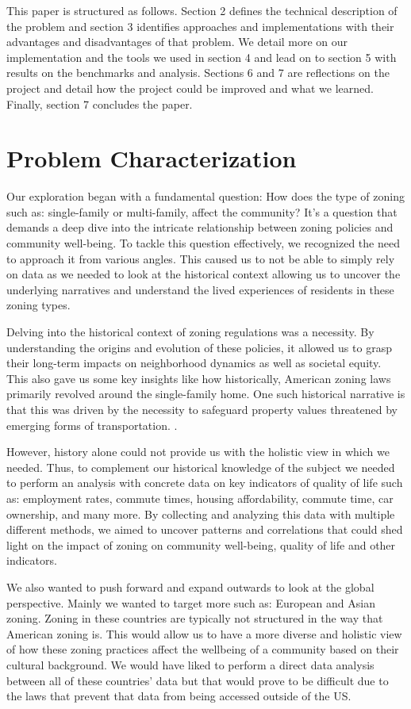 \documentclass[titlepage]{article}
\begin{document}
This paper is structured  as follows. Section 2 defines the technical description of the problem and section 3 identifies approaches and implementations with their advantages and disadvantages of that problem. We detail more on our implementation and the tools we used in section 4 and lead on to section 5 with results on the benchmarks and analysis. Sections 6 and 7 are reflections on the project and detail how the project could be improved and what we learned. Finally, section 7 concludes the paper.


\section{Problem Characterization}
Our exploration began with a fundamental question: How does the type of zoning such as: single-family or multi-family, affect the community? It's a question that demands a deep dive into the intricate relationship between zoning policies and community well-being. To tackle this question effectively, we recognized the need to approach it from various angles. This caused us to not be able to simply rely on data as we needed to look at the historical context allowing us to uncover the underlying narratives and understand the lived experiences of residents in these zoning types. 

Delving into the historical context of zoning regulations was a necessity. By understanding the origins and evolution of these policies, it allowed us to grasp their long-term impacts on neighborhood dynamics as well as societal equity. This also gave us some key insights like how historically, American zoning laws primarily revolved around the single-family home. One such historical narrative is that this was driven by the necessity to safeguard property values threatened by emerging forms of transportation. \cite{History}.

However, history alone could not provide us with the holistic view in which we needed. Thus, to complement our historical knowledge of the subject we needed to perform an analysis with concrete data on key indicators of quality of life such as: employment rates, commute times, housing affordability, commute time, car ownership, and many more. By collecting and analyzing this data with multiple different methods, we aimed to uncover patterns and correlations that could shed light on the impact of zoning on community well-being, quality of life and other indicators. 

We also wanted to push forward and expand outwards to look at the global perspective. Mainly we wanted to target more such as: European and Asian zoning. Zoning in these countries are typically not structured in the way that American zoning is. This would allow us to have a more diverse and holistic view of how these zoning practices affect the wellbeing of a community based on their cultural background. We would have liked to perform a direct data analysis between all of these countries' data but that would prove to be difficult due to the laws that prevent that data from being accessed outside of the US.
\end{document}
